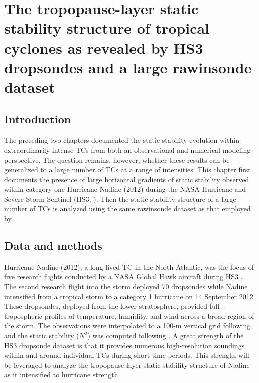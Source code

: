  
\chapter{The tropopause-layer static stability structure of tropical cyclones as revealed by HS3 dropsondes and a large rawinsonde dataset}
\label{chapter:hs3}
\resetfootnote %

\section{Introduction}

The preceding two chapters documented the static stability evolution within extraordinarily intense TCs from both an observational and numerical modeling perspective.
The question remains, however, whether these results can be generalized to a large number of TCs at a range of intensities.
This chapter first documents the presence of large horizontal gradients of static stability observed within category one Hurricane Nadine (2012) during the NASA Hurricane and Severe Storm Sentinel (HS3; \citeauthor{Braunetal2016} \citeyear{Braunetal2016}).
Then the static stability structure of a large number of TCs is analyzed using the same rawinsonde dataset as that employed by \cite{DuranMolinari2016}.

\section{Data and methods}
Hurricane Nadine (2012), a long-lived TC in the North Atlantic, was the focus of five research flights conducted by a NASA Global Hawk aircraft during HS3 \citep{Braunetal2016}.
The second research flight into the storm deployed 70 dropsondes \cite{Young2016} while Nadine intensified from a tropical storm to a category 1 hurricane \citep{Brown2013} on 14 September 2012.
These dropsondes, deployed from the lower stratosphere, provided full-tropospheric profiles of temperature, humidity, and wind across a broad region of the storm.
The observations were interpolated to a 100-m vertical grid following \cite{MolinariVollaro2010} and the static stability ($N^2$) was computed following \cite{DuranMolinari2018}.
A great strength of the HS3 dropsonde dataset is that it provides numerous high-resolution soundings within and around individual TCs during short time periods.
This strength will be leveraged to analyze the tropopause-layer static stability structure of Nadine as it intensified to hurricane strength.

